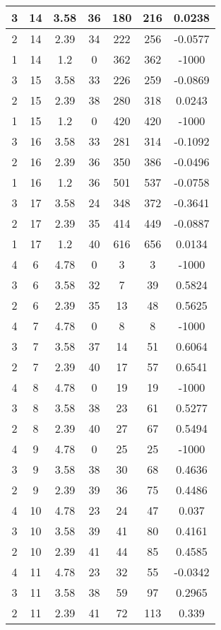 \documentclass[letterpaper, 12pt]{article}
\begin{document}
\begin{longtable}{|c|c|c|c|c|c|c|}
\hline
3 & 14 & 3.58 & 36 & 180 & 216 & 0.0238 \\
\hline
2 & 14 & 2.39 & 34 & 222 & 256 & -0.0577 \\
\hline
1 & 14 & 1.2 & 0 & 362 & 362 & -1000 \\
\hline
3 & 15 & 3.58 & 33 & 226 & 259 & -0.0869 \\
\hline
2 & 15 & 2.39 & 38 & 280 & 318 & 0.0243 \\
\hline
1 & 15 & 1.2 & 0 & 420 & 420 & -1000 \\
\hline
3 & 16 & 3.58 & 33 & 281 & 314 & -0.1092 \\
\hline
2 & 16 & 2.39 & 36 & 350 & 386 & -0.0496 \\
\hline
1 & 16 & 1.2 & 36 & 501 & 537 & -0.0758 \\
\hline
3 & 17 & 3.58 & 24 & 348 & 372 & -0.3641 \\
\hline
2 & 17 & 2.39 & 35 & 414 & 449 & -0.0887 \\
\hline
1 & 17 & 1.2 & 40 & 616 & 656 & 0.0134 \\
\hline
4 & 6 & 4.78 & 0 & 3 & 3 & -1000 \\
\hline
3 & 6 & 3.58 & 32 & 7 & 39 & 0.5824 \\
\hline
2 & 6 & 2.39 & 35 & 13 & 48 & 0.5625 \\
\hline
4 & 7 & 4.78 & 0 & 8 & 8 & -1000 \\
\hline
3 & 7 & 3.58 & 37 & 14 & 51 & 0.6064 \\
\hline
2 & 7 & 2.39 & 40 & 17 & 57 & 0.6541 \\
\hline
4 & 8 & 4.78 & 0 & 19 & 19 & -1000 \\
\hline
3 & 8 & 3.58 & 38 & 23 & 61 & 0.5277 \\
\hline
2 & 8 & 2.39 & 40 & 27 & 67 & 0.5494 \\
\hline
4 & 9 & 4.78 & 0 & 25 & 25 & -1000 \\
\hline
3 & 9 & 3.58 & 38 & 30 & 68 & 0.4636 \\
\hline
2 & 9 & 2.39 & 39 & 36 & 75 & 0.4486 \\
\hline
4 & 10 & 4.78 & 23 & 24 & 47 & 0.037 \\
\hline
3 & 10 & 3.58 & 39 & 41 & 80 & 0.4161 \\
\hline
2 & 10 & 2.39 & 41 & 44 & 85 & 0.4585 \\
\hline
4 & 11 & 4.78 & 23 & 32 & 55 & -0.0342 \\
\hline
3 & 11 & 3.58 & 38 & 59 & 97 & 0.2965 \\
\hline
2 & 11 & 2.39 & 41 & 72 & 113 & 0.339 \\

\end{longtable}
\end{document}
